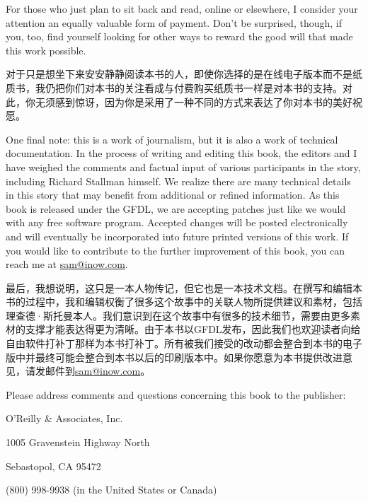 \ifdefined\eng
For those who just plan to sit back and read, online or elsewhere, I consider your attention an equally valuable form of payment. Don't be surprised, though, if you, too, find yourself looking for other ways to reward the good will that made this work possible.
\fi

\ifdefined\chs
对于只是想坐下来安安静静阅读本书的人，即使你选择的是在线电子版本而不是纸质书，我仍把你们对本书的关注看成与付费购买纸质书一样是对本书的支持。对此，你无须感到惊讶，因为你是采用了一种不同的方式来表达了你对本书的美好祝愿。
\fi

\ifdefined\eng
One final note: this is a work of journalism, but it is also a work of technical documentation. In the process of writing and editing this book, the editors and I have weighed the comments and factual input of various participants in the story, including Richard Stallman himself. We realize there are many technical details in this story that may benefit from additional or refined information. As this book is released under the GFDL, we are accepting patches just like we would with any free software program. Accepted changes will be posted electronically and will eventually be incorporated into future printed versions of this work. If you would like to contribute to the further improvement of this book, you can reach me at \url{sam@inow.com}.
\fi

\ifdefined\chs
最后，我想说明，这只是一本人物传记，但它也是一本技术文档。在撰写和编辑本书的过程中，我和编辑权衡了很多这个故事中的关联人物所提供建议和素材，包括理查德·斯托曼本人。我们意识到在这个故事中有很多的技术细节，需要由更多素材的支撑才能表达得更为清晰。由于本书以GFDL发布，因此我们也欢迎读者向给自由软件打补丁那样为本书打补丁。所有被我们接受的改动都会整合到本书的电子版中并最终可能会整合到本书以后的印刷版本中。如果你愿意为本书提供改进意见，请发邮件到\url{sam@inow.com}。 
\fi

\bigskip 

\ifdefined\eng
{}
\fi

\ifdefined\chs
{}
\fi

\bigskip 

\ifdefined\eng
Please address comments and questions concerning this book to the publisher:

O'Reilly \& Associates, Inc. 

1005 Gravenstein Highway North 

Sebastopol, CA 95472 

(800) 998-9938 (in the United States or Canada) 

